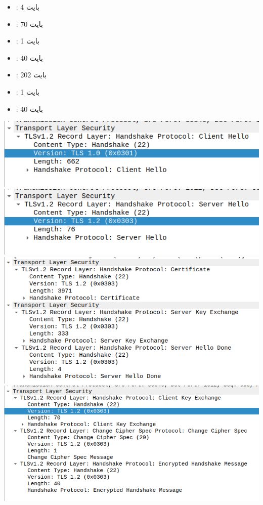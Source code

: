 \begin{enumerate}[label=\alph*)]
\begin{itemize}
        \item {} : 4 بایت
        \item {} : 70 بایت 
        \item {} : 1 بایت 
        \item {} : 40 بایت 
        \item {} : 202 بایت 
        \item {} : 1 بایت 
        \item {} : 40 بایت
    \end{itemize}
    \begin{center}
        \includegraphics[scale=0.38]{pics/w1.png}
        \includegraphics[scale=0.38]{pics/w2.png}
        \includegraphics[scale=0.38]{pics/w3.png}
        \includegraphics[scale=0.38]{pics/w4.png}

\end{center}
\end{enumerate}
